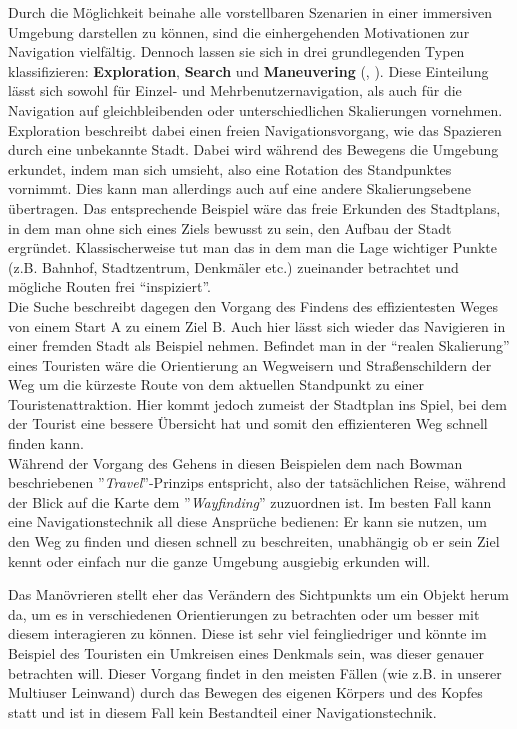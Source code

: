 Durch die Möglichkeit beinahe alle vorstellbaren Szenarien in einer immersiven Umgebung darstellen zu können, sind die einhergehenden Motivationen zur Navigation vielfältig. Dennoch lassen sie sich in drei grundlegenden Typen klassifizieren: \textbf{Exploration}, \textbf{Search} und \textbf{Maneuvering} (\cite{Bowman2001AnDesign}, \cite{KulikBuildingTechniques}). 
Diese Einteilung lässt sich sowohl für Einzel- und Mehrbenutzernavigation, als auch für die Navigation auf gleichbleibenden oder unterschiedlichen Skalierungen vornehmen.
Exploration beschreibt dabei einen freien Navigationsvorgang, wie das Spazieren durch eine unbekannte Stadt. Dabei wird während des Bewegens die Umgebung erkundet, indem man sich umsieht, also eine Rotation des Standpunktes vornimmt. 
Dies kann man allerdings auch auf eine andere Skalierungsebene übertragen. Das entsprechende Beispiel wäre das freie Erkunden des Stadtplans, in dem man ohne sich eines Ziels bewusst zu sein, den Aufbau der Stadt ergründet. Klassischerweise tut man das in dem man die Lage wichtiger Punkte (z.B. Bahnhof, Stadtzentrum, Denkmäler etc.) zueinander betrachtet und mögliche Routen frei “inspiziert”.\\
Die Suche beschreibt dagegen den Vorgang des Findens des effizientesten Weges von einem Start A zu einem Ziel B. Auch hier lässt sich wieder das Navigieren in einer fremden Stadt als Beispiel nehmen. Befindet man in der “realen Skalierung” eines Touristen wäre die Orientierung an Wegweisern und Straßenschildern der Weg um die kürzeste Route von dem aktuellen Standpunkt zu einer Touristenattraktion. Hier kommt jedoch zumeist der Stadtplan ins Spiel, bei dem der Tourist eine bessere Übersicht hat und somit den effizienteren Weg schnell finden kann.\\
Während der Vorgang des Gehens in diesen Beispielen dem nach Bowman beschriebenen ”\textit{Travel}”-Prinzips entspricht, also der tatsächlichen Reise, während der Blick auf die Karte dem ”\textit{Wayfinding}” zuzuordnen ist. 
Im besten Fall kann eine Navigationstechnik all diese Ansprüche bedienen: Er kann sie nutzen, um den Weg zu finden und diesen schnell zu beschreiten, unabhängig ob er sein Ziel kennt oder einfach nur die ganze Umgebung ausgiebig erkunden will.

Das Manövrieren stellt eher das Verändern des Sichtpunkts um ein Objekt herum da, um es in verschiedenen Orientierungen zu betrachten oder um besser mit diesem interagieren zu können. Diese ist sehr viel feingliedriger und könnte im Beispiel des Touristen ein Umkreisen eines Denkmals sein, was dieser genauer betrachten will. Dieser Vorgang findet in den meisten Fällen (wie z.B. in unserer Multiuser Leinwand) durch das Bewegen des eigenen Körpers und des Kopfes statt und ist in diesem Fall kein Bestandteil einer Navigationstechnik.

